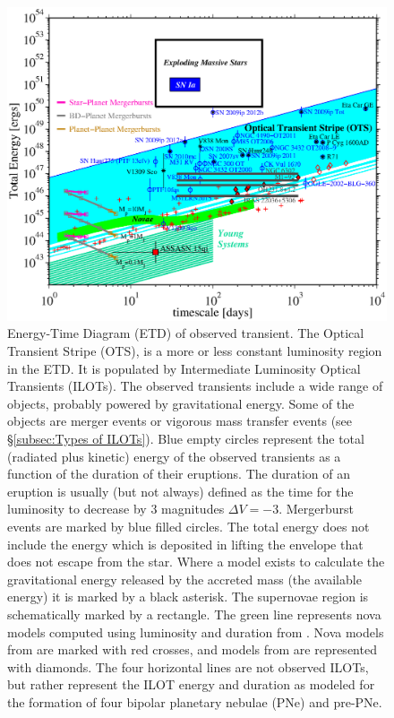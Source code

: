 \documentclass[a4paper,modern]{aastex62}
\begin{document}
\begin{figure}[ht!]
\begin{center}
\includegraphics[width=1.05\textwidth]{etd.eps}
\end{center}
\caption{Energy-Time Diagram (ETD) of observed transient. The Optical Transient Stripe (OTS), is a more or less constant luminosity region in the ETD. It is populated by Intermediate Luminosity Optical Transients (ILOTs). The observed transients include a wide range of objects, probably powered by gravitational energy.
Some of the objects are merger events or vigorous mass transfer events (see \S\ref{subsec:Types of ILOTs}). Blue empty circles represent the total (radiated plus kinetic) energy of the observed transients as a function of the duration of their eruptions. The duration of an eruption is usually (but not always) defined as the time for the luminosity to decrease by 3 magnitudes $\Delta V=-3$. 
Mergerburst events are marked by blue filled circles.
The total energy does not include the energy which is deposited in lifting the envelope that does not escape from the star. Where a model exists to calculate the gravitational energy released by the accreted mass (the available energy) it is marked by a black asterisk.
The supernovae region is schematically marked by a rectangle. The green line represents nova models computed using luminosity and duration from \cite{1995ApJ...452..704D}. Nova models from \cite{2005ApJ...623..398Y} are marked with red crosses, and models from \cite{2010ApJ...725..831S} are represented with diamonds.
The four horizontal lines are not observed ILOTs, but rather represent the ILOT energy and duration as \cite{2012ApJ...746..100S} modeled for the formation of four bipolar planetary nebulae (PNe) and pre-PNe.
}\label{fig:ilot-club}
\end{figure}
\end{document}
